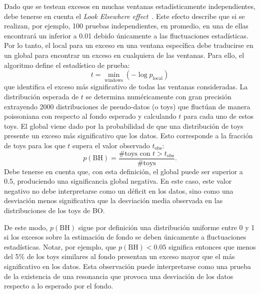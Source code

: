 Dado que se testean excesos en muchas ventanas estadísticamente independientes, debe tenerse en cuenta el \textit{Look Elsewhere effect}~\cite{LookElsewhereEffect}. Este efecto describe que si se realizan, por ejemplo, 100 pruebas independientes, en promedio, en una de ellas encontrará un \pval inferior a 0.01 debido únicamente a las fluctuaciones estadísticas. Por lo tanto, el \pval local para un exceso en una ventana específica debe traducirse en un \pval global para encontrar un exceso en cualquiera de las ventanas. Para ello, el algoritmo \bh define el estadístico de prueba:
\begin{equation}
    \label{eq:strategy:stat_treatment:bh:bh_statistic}
    t = \min_{\text{windows}} \left( - \log p_{\text{local}} \right)
\end{equation}
que identifica el exceso más significativo de todas las ventanas consideradas. La distribución esperada de \(t\) se determina numéricamente con gran precisión extrayendo 2000 distribuciones de pseudo-datos (o toys) que fluctúan de manera poissoniana con respecto al fondo esperado y calculando \(t\) para cada uno de estos toys. El \pval global viene dado por la probabilidad de que una distribución de toys presente un exceso más significativo que los datos. Esto corresponde a la fracción de toys para los que \(t\) supera el valor observado \(t_{\text{obs}}\):
\begin{equation}
    \label{eq:strategy:stat_treatment:bh:bh_pval}
    p(\text{BH}) = \frac{\text{\# toys con } t > t_{\text{obs}}}{\text{\# toys}}.
\end{equation}
Debe tenerse en cuenta que, con esta definición, el \pval global puede ser superior a 0.5, produciendo una significancia global negativa. En este caso, este valor negativo no debe interpretarse como un déficit en los datos, sino como una desviación menos significativa que la desviación media observada en las distribuciones de los toys de \ac{BO}.

De este modo, \(p(\text{BH})\) sigue por definición una distribución uniforme entre 0 y 1 si los excesos sobre la estimación de fondo se deben únicamente a fluctuaciones estadísticas. Notar, por ejemplo, que \(p(\text{BH}) < 0.05\) significa entonces que menos del 5\% de los toys similares al fondo presentan un exceso mayor que el más significativo en los datos. Esta observación puede interpretarse como una prueba de la existencia de una resonancia que provoca una desviación de los datos respecto a lo esperado por el fondo.
